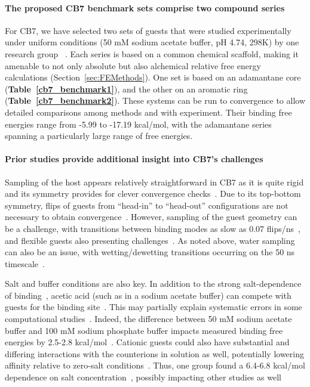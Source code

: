 \documentclass[aps,pre,twocolumn,nofootinbib,superscriptaddress,10pt, final,tightenlines]{revtex4-1}
\begin{document}
\paragraph{The proposed CB7 benchmark sets comprise two compound series}
For CB7, we have selected two sets of guests that were studied experimentally under uniform conditions (50 mM sodium acetate buffer, pH 4.74, 298K) by one research group ~\cite{liu_cucurbituril_2005, cao_attomolar_2014}. Each series is based on a common chemical
scaffold, making it amenable to not only absolute but also alchemical relative free energy calculations (Section~\ref{sec:FEMethods}). One set is based on an adamantane core ({\bf Table~\ref{cb7_benchmark1}}), and the other on an aromatic ring ({\bf Table~\ref{cb7_benchmark2}}).
These systems can be run to convergence to allow detailed comparisons among methods and with experiment.
Their binding free energies range from -5.99 to -17.19 kcal/mol, with the adamantane series spanning a particularly large range of free energies. 


\paragraph{Prior studies provide additional insight into CB7's challenges}
Sampling of the host appears relatively straightforward in CB7 as it is quite rigid and its symmetry provides for clever convergence checks~\cite{henriksen_computational_2015, monroe_converging_2014}. 
Due to its top-bottom symmetry, flips of guests from ``head-in'' to ``head-out'' configurations are not necessary to obtain convergence~\cite{fenley_bridging_2014}.
However, sampling of the guest geometry can be a challenge, with transitions between binding modes as slow as 0.07 flips/ns~\cite{monroe_converging_2014}, and flexible guests also presenting challenges~\cite{monroe_converging_2014}. 
As noted above, water sampling can also be an issue, with wetting/dewetting transitions occurring on the 50 ns timescale~\cite{rogers_role_2013}.

Salt and buffer conditions are also key. 
In addition to the strong salt-dependence of binding~\cite{moghaddam_new_2011}, acetic acid (such as in a sodium acetate buffer) can compete with guests for the binding site~\cite{moghaddam_hostguest_2009}. 
This may partially explain systematic errors in some computational studies~\cite{muddana_blind_2014,hsiao_prediction_2014}. 
Indeed, the difference between 50 mM sodium acetate buffer and 100 mM sodium phosphate buffer impacts measured binding free energies by 2.5-2.8 kcal/mol~\cite{muddana_blind_2014, muddana_sampl4_2014}.  
Cationic guests could also have substantial and differing interactions with the counterions in solution as well, potentially lowering affinity relative to zero-salt conditions~\cite{muddana_sampl4_2014}.  
Thus, one group found a 6.4-6.8 kcal/mol dependence on salt concentration~\cite{hsiao_prediction_2014}, possibly impacting other studies as well~\cite{monroe_converging_2014}
\end{document}
